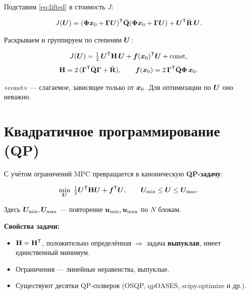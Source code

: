 Подставим \eqref{eq:lifted} в стоимость $J$:

\[
  J(\bm{U}) = (\mathbf{\Phi}\bm{x}_0 + \mathbf{\Gamma}\bm{U})^{\mathsf{T}} \bar{\mathbf{Q}}
                 (\mathbf{\Phi}\bm{x}_0 + \mathbf{\Gamma}\bm{U})
               + \bm{U}^{\mathsf{T}} \bar{\mathbf{R}}\,\bm{U}.
\]

Раскрываем и группируем по степеням $\bm{U}$:

\begin{formulabox}[title={Квадратичная форма стоимости}]
\begin{equation}
  J(\bm{U}) = \tfrac{1}{2}\,\bm{U}^{\mathsf{T}} \mathbf{H}\,\bm{U} + \bm{f}(\bm{x}_0)^{\mathsf{T}} \bm{U} + \text{const},
  \label{eq:quad_cost}
\end{equation}
\[
  \mathbf{H} = 2\,(\mathbf{\Gamma}^{\mathsf{T}} \bar{\mathbf{Q}}\mathbf{\Gamma} + \bar{\mathbf{R}}),
  \qquad
  \bm{f}(\bm{x}_0) = 2\,\mathbf{\Gamma}^{\mathsf{T}} \bar{\mathbf{Q}}\mathbf{\Phi}\,\bm{x}_0.
\]
\end{formulabox}

«const» --- слагаемое, зависящее только от $\bm{x}_0$. Для оптимизации
по $\bm{U}$ оно неважно.

\section{Квадратичное программирование (QP)}

С учётом ограничений MPC превращается в каноническую \textbf{QP-задачу}:

\begin{formulabox}[title={QP-постановка MPC}]
\begin{equation}
  \min_{\bm{U}}\; \tfrac{1}{2} \bm{U}^{\mathsf{T}} \mathbf{H}\bm{U} + \bm{f}^{\mathsf{T}} \bm{U},
  \qquad
  \bm{U}_\text{min} \le \bm{U} \le \bm{U}_\text{max}.
  \label{eq:qp}
\end{equation}
\end{formulabox}

Здесь $\bm{U}_\text{min}, \bm{U}_\text{max}$ --- повторение
$\bm{u}_\text{min}, \bm{u}_\text{max}$ по $N$ блокам.

\textbf{Свойства задачи:}
\begin{itemize}
  \item $\mathbf{H} = \mathbf{H}^{\mathsf{T}}$, положительно определённая
        $\Rightarrow$ задача \textbf{выпуклая}, имеет единственный
        минимум.
  \item Ограничения --- линейные неравенства, выпуклые.
  \item Существуют десятки QP-солверов (OSQP, qpOASES, scipy.optimize и др.).
\end{itemize}

